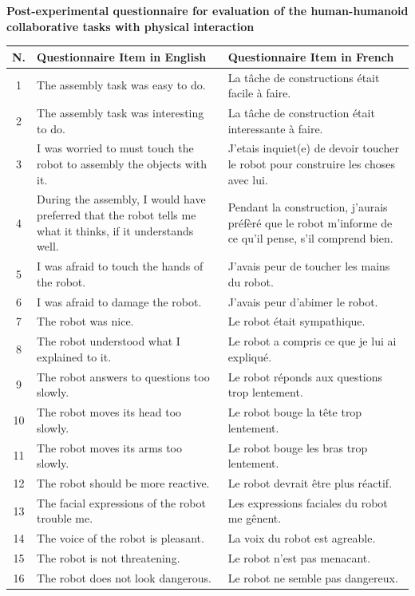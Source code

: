 \documentclass[twocolumn]{svjour3}          %
\begin{document}
\begin{table}
\textbf{Post-experimental questionnaire for evaluation of the human-humanoid collaborative tasks with physical interaction}

\begin{tabular}{|c|p{7.5cm}|p{7.5cm}|}
\hline
N. & Questionnaire Item in English & Questionnaire Item in French  \\
 \hline
 \hline
1 & The assembly task was easy to do. & La tâche de constructions était facile à faire.\\
2 & The assembly task was interesting to do.& La tâche de construction était interessante à faire.	\\
3 & I was worried to must touch the robot to assembly the objects with it. & J'etais inquiet(e) de devoir toucher le robot pour construire les choses avec lui.\\
4 & During the assembly, I would have preferred that the robot tells me what it thinks, if it understands well. & Pendant la construction, j'aurais préfèré que le robot m'informe de ce qu'il pense, s'il comprend bien.\\
5 & I was afraid to touch the hands of the robot. & J'avais peur de toucher les mains du robot.\\
6 & I was afraid to damage the robot. &	J'avais peur d'abimer le robot.	\\
7 & The robot was nice. & Le robot était sympathique.\\
8 & The robot understood what I explained to it.&	Le robot a compris ce que je lui ai expliqué. \\
9 & The robot answers to questions too slowly. & Le robot réponds aux questions trop lentement. \\
10 & The robot moves its head too slowly. & Le robot bouge la tête trop lentement.\\
11 & The robot moves its arms too slowly. & Le robot bouge les bras trop lentement.\\
12 & The robot should be more reactive.& Le robot devrait être plus réactif.\\
13 & The facial expressions of the robot trouble me.& Les expressions faciales du robot me gênent.\\
14 & The voice of the robot is pleasant.& La voix du robot est agreable.\\
15 & The robot is not threatening.& Le robot n'est pas menacant.\\
16 & The robot does not look dangerous.& Le robot ne semble pas dangereux.\\

\end{tabular}
\end{table}
\end{document}
